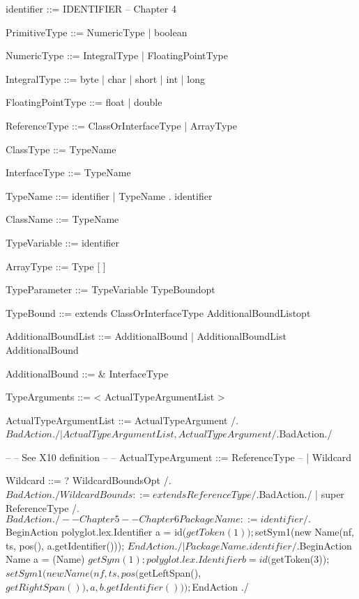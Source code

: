 
    identifier ::= IDENTIFIER
    -- Chapter 4

    PrimitiveType ::= NumericType
                    | boolean

    NumericType ::= IntegralType
                  | FloatingPointType

    IntegralType ::= byte
                   | char
                   | short
                   | int
                   | long

    FloatingPointType ::= float
                        | double

    ReferenceType ::= ClassOrInterfaceType
                    | ArrayType

    ClassType ::= TypeName 

    InterfaceType ::= TypeName 

    TypeName ::= identifier
               | TypeName . identifier

    ClassName ::= TypeName

    TypeVariable ::= identifier

    ArrayType ::= Type [ ]

    TypeParameter ::= TypeVariable TypeBoundopt

    TypeBound ::= extends ClassOrInterfaceType AdditionalBoundListopt

    AdditionalBoundList ::= AdditionalBound
                          | AdditionalBoundList AdditionalBound

    AdditionalBound ::= & InterfaceType

    TypeArguments ::= < ActualTypeArgumentList >

    ActualTypeArgumentList ::= ActualTypeArgument
        /.$BadAction./
                             | ActualTypeArgumentList , ActualTypeArgument
        /.$BadAction./

--
-- See X10 definition
--
--    ActualTypeArgument ::= ReferenceType
--                         | Wildcard

    Wildcard ::= ? WildcardBoundsOpt
        /.$BadAction./

    WildcardBounds ::= extends ReferenceType
        /.$BadAction./
                     | super ReferenceType
        /.$BadAction./

    -- Chapter 5

    -- Chapter 6

    PackageName ::= identifier
        /.$BeginAction
                    polyglot.lex.Identifier a = id($getToken(1));
                    $setSym1(new Name(nf, ts, pos(), a.getIdentifier()));
          $EndAction
        ./
                  | PackageName . identifier
        /.$BeginAction
                    Name a = (Name) $getSym(1);
                    polyglot.lex.Identifier b = id($getToken(3));
                    $setSym1(new Name(nf,
                                      ts,
                                      pos($getLeftSpan(), $getRightSpan()),
                                      a,
                                      b.getIdentifier()));
          $EndAction
        ./

